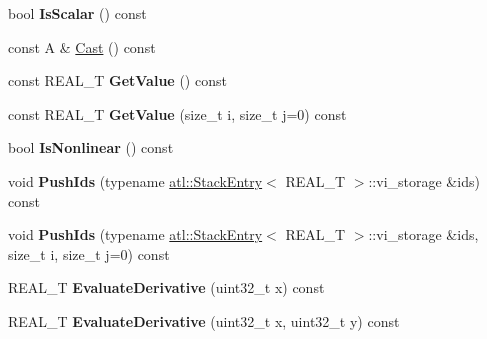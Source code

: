\begin{DoxyCompactItemize}
\item 
\hypertarget{structatl_1_1_expression_base_a83b116cac0f598f22a2342cc2fdb7214}{bool {\bfseries Is\+Scalar} () const }\label{structatl_1_1_expression_base_a83b116cac0f598f22a2342cc2fdb7214}

\item 
const A \& \hyperlink{structatl_1_1_expression_base_a48c72f931e64d269c8721f940693ebda}{Cast} () const 
\item 
\hypertarget{structatl_1_1_expression_base_a5f19881cfcf10906ace851129d379bb1}{const R\+E\+A\+L\+\_\+\+T {\bfseries Get\+Value} () const }\label{structatl_1_1_expression_base_a5f19881cfcf10906ace851129d379bb1}

\item 
\hypertarget{structatl_1_1_expression_base_a2e4e10e53867b26cd638cfb588f90a50}{const R\+E\+A\+L\+\_\+\+T {\bfseries Get\+Value} (size\+\_\+t i, size\+\_\+t j=0) const }\label{structatl_1_1_expression_base_a2e4e10e53867b26cd638cfb588f90a50}

\item 
\hypertarget{structatl_1_1_expression_base_af31c04a9315fb7ab8d324f710592f1af}{bool {\bfseries Is\+Nonlinear} () const }\label{structatl_1_1_expression_base_af31c04a9315fb7ab8d324f710592f1af}

\item 
\hypertarget{structatl_1_1_expression_base_a4b69562e0847c41ddcc0dd2cc8b0613b}{void {\bfseries Push\+Ids} (typename \hyperlink{structatl_1_1_stack_entry}{atl\+::\+Stack\+Entry}$<$ R\+E\+A\+L\+\_\+\+T $>$\+::vi\+\_\+storage \&ids) const }\label{structatl_1_1_expression_base_a4b69562e0847c41ddcc0dd2cc8b0613b}

\item 
\hypertarget{structatl_1_1_expression_base_a4810cb822b3ad40d1a8105802e3dcad8}{void {\bfseries Push\+Ids} (typename \hyperlink{structatl_1_1_stack_entry}{atl\+::\+Stack\+Entry}$<$ R\+E\+A\+L\+\_\+\+T $>$\+::vi\+\_\+storage \&ids, size\+\_\+t i, size\+\_\+t j=0) const }\label{structatl_1_1_expression_base_a4810cb822b3ad40d1a8105802e3dcad8}

\item 
\hypertarget{structatl_1_1_expression_base_a8d4acaf0df7c5c41f73a81cd09695206}{R\+E\+A\+L\+\_\+\+T {\bfseries Evaluate\+Derivative} (uint32\+\_\+t x) const }\label{structatl_1_1_expression_base_a8d4acaf0df7c5c41f73a81cd09695206}

\item 
\hypertarget{structatl_1_1_expression_base_aa80bf0d6473b57c0e32c4a6c41054542}{R\+E\+A\+L\+\_\+\+T {\bfseries Evaluate\+Derivative} (uint32\+\_\+t x, uint32\+\_\+t y) const }\label{structatl_1_1_expression_base_aa80bf0d6473b57c0e32c4a6c41054542}


\end{DoxyCompactItemize}
